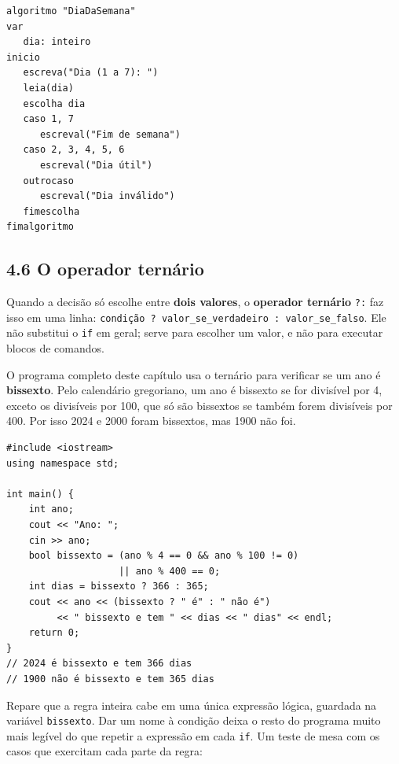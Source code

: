 \begin{codigo}
\begin{Verbatim}[breaklines=true, breaksymbolleft={}, fontsize=\footnotesize]
algoritmo "DiaDaSemana"
var
   dia: inteiro
inicio
   escreva("Dia (1 a 7): ")
   leia(dia)
   escolha dia
   caso 1, 7
      escreval("Fim de semana")
   caso 2, 3, 4, 5, 6
      escreval("Dia útil")
   outrocaso
      escreval("Dia inválido")
   fimescolha
fimalgoritmo
\end{Verbatim}
\end{codigo}

\subsection{4.6 O operador ternário}

Quando a decisão só escolhe entre \textbf{dois valores}, o \textbf{operador ternário} \texttt{?:} faz isso em uma linha: \texttt{condição ? valor\_se\_verdadeiro : valor\_se\_falso}. Ele não substitui o \texttt{if} em geral; serve para escolher um valor, e não para executar blocos de comandos.

O programa completo deste capítulo usa o ternário para verificar se um ano é \textbf{bissexto}. Pelo calendário gregoriano, um ano é bissexto se for divisível por 4, exceto os divisíveis por 100, que só são bissextos se também forem divisíveis por 400. Por isso 2024 e 2000 foram bissextos, mas 1900 não foi.

\begin{codigo}
\begin{Verbatim}[breaklines=true, breaksymbolleft={}, fontsize=\footnotesize]
#include <iostream>
using namespace std;

int main() {
    int ano;
    cout << "Ano: ";
    cin >> ano;
    bool bissexto = (ano % 4 == 0 && ano % 100 != 0)
                    || ano % 400 == 0;
    int dias = bissexto ? 366 : 365;
    cout << ano << (bissexto ? " é" : " não é")
         << " bissexto e tem " << dias << " dias" << endl;
    return 0;
}
// 2024 é bissexto e tem 366 dias
// 1900 não é bissexto e tem 365 dias
\end{Verbatim}
\end{codigo}

Repare que a regra inteira cabe em uma única expressão lógica, guardada na variável \texttt{bissexto}. Dar um nome à condição deixa o resto do programa muito mais legível do que repetir a expressão em cada \texttt{if}. Um teste de mesa com os casos que exercitam cada parte da regra:

